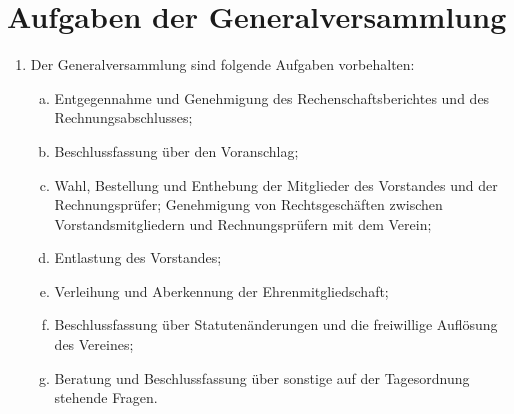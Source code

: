 \documentclass[a4paper,12pt]{article}
\begin{document}
\section{Aufgaben der Generalversammlung} %
\label{sec:Generalversammlung-Aufgaben}
\begin{enumerate}
\item Der Generalversammlung sind folgende Aufgaben vorbehalten:
  \begin{enumerate}[(a)]
  \item Entgegennahme und Genehmigung des Rechenschaftsberichtes und des Rechnungsabschlusses;
  \item Beschlussfassung über den Voranschlag;
  \item Wahl, Bestellung und Enthebung der Mitglieder des Vorstandes und der Rechnungsprüfer; Genehmigung von Rechtsgeschäften zwischen Vorstandsmitgliedern und Rechnungsprüfern mit dem Verein;
  \item Entlastung des Vorstandes;
  \item Verleihung und Aberkennung der Ehrenmitgliedschaft;
  \item Beschlussfassung über Statutenänderungen und die freiwillige Auflösung des Vereines;
  \item Beratung und Beschlussfassung über sonstige auf der Tagesordnung stehende Fragen.
  \end{enumerate}
\end{enumerate}
\end{document}
